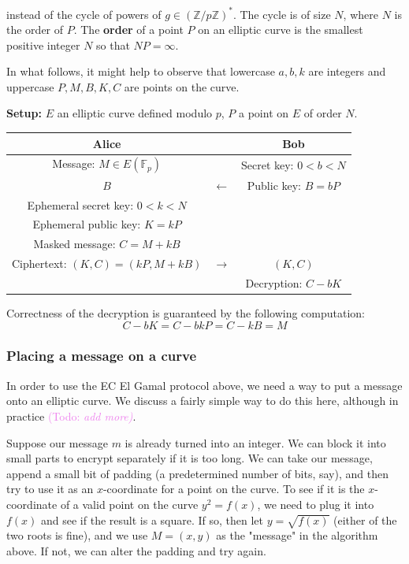 \documentclass{article}
\theoremstyle{plain}
\theoremstyle{definition}
\theoremstyle{remark}
\numberwithin{theorem}{section}
\newcommand{\KS}[1]{\textcolor{violet}{{\sf (Todo:} {\sl{#1})}}}
\newcommand{\KS}[1]{}
\newcommand{\FF}{\mathbb{F}}
\newcommand{\ZZ}{\mathbb{Z}}
\begin{document}
instead of the cycle of powers of $g \in (\ZZ/p\ZZ)^*$.  The cycle is of size $N$, where $N$ is the order of $P$.  The \textbf{order} of a point $P$ on an elliptic curve is the smallest positive integer $N$ so that $NP = \infty$.

In what follows, it might help to observe that lowercase $a,b,k$ are integers and uppercase $P, M, B, K, C$ are points on the curve.

     {\bf Setup:}  $E$ an elliptic curve defined modulo $p$, $P$ a point on $E$ of order $N$.
     \vspace{1em}

     \begin{tabular}{ccc}
       Alice & & Bob \\
       \hline
       Message: $M \in E(\FF_p)$ & &  Secret key: $0 < b < N$ \\
       $B$ & $\longleftarrow$ & Public key: $B = bP$ \\
       Ephemeral secret key: $0 < k < N$ & &  \\
       Ephemeral public key: $K = kP$ & &  \\
       Masked message: $C = M + kB$ & &  \\
       Ciphertext: $(K,C) = (kP, M + kB)$ & $\longrightarrow$ & $(K,C)$ \\
					      & & Decryption: $C - bK$ \\
      \end{tabular}
      \vspace{3em}
      

      Correctness of the decryption is guaranteed by the following computation:
      \[
      C - bK = C - bkP = C - kB = M
      \]


\subsubsection{Placing a message on a curve}

In order to use the EC El Gamal protocol above, we need a way to put a message onto an elliptic curve.  We discuss a fairly simple way to do this here, although in practice \KS{add more}.

Suppose our message $m$ is already turned into an integer.  We can block it into small parts to encrypt separately if it is too long.  We can take our message, append a small bit of padding (a predetermined number of bits, say), and then try to use it as an $x$-coordinate for a point on the curve.  To see if it is the $x$-coordinate of a valid point on the curve $y^2 = f(x)$, we need to plug it into $f(x)$ and see if the result is a square.  If so, then let $y = \sqrt{f(x)}$ (either of the two roots is fine), and we use $M = (x,y)$ as the "message" in the algorithm above.  If not, we can alter the padding and try again.
\end{document}
